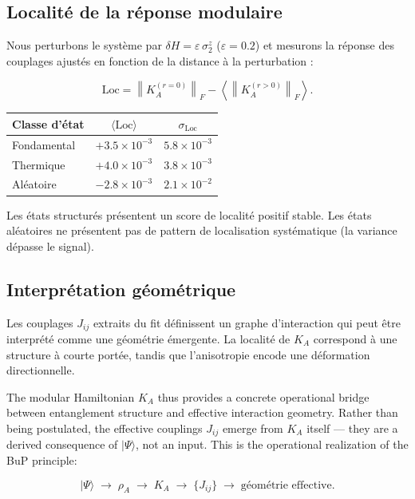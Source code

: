 \documentclass[11pt]{article}
\begin{document}
\subsection{Localité de la réponse modulaire}

Nous perturbons le système par $\delta H = \varepsilon\,\sigma_2^z$ ($\varepsilon = 0.2$) et mesurons la réponse des couplages ajustés en fonction de la distance à la perturbation :

\[
\mathrm{Loc} = \left\|K_A^{(r=0)}\right\|_F - \left\langle \left\|K_A^{(r>0)}\right\|_F \right\rangle.
\]

\begin{center}
\begin{tabular}{lcc}
\toprule
Classe d'état & $\langle\mathrm{Loc}\rangle$ & $\sigma_{\mathrm{Loc}}$ \\
\midrule
Fondamental & $+3.5 \times 10^{-3}$ & $5.8 \times 10^{-3}$ \\
Thermique   & $+4.0 \times 10^{-3}$ & $3.8 \times 10^{-3}$ \\
Aléatoire   & $-2.8 \times 10^{-3}$ & $2.1 \times 10^{-2}$ \\
\bottomrule
\end{tabular}
\end{center}

Les états structurés présentent un score de localité positif stable. Les états aléatoires ne présentent pas de pattern de localisation systématique (la variance dépasse le signal).

\subsection{Interprétation géométrique}

Les couplages $J_{ij}$ extraits du fit définissent un graphe d'interaction qui peut être interprété comme une géométrie émergente. La localité de $K_A$ correspond à une structure à courte portée, tandis que l'anisotropie encode une déformation directionnelle.

\medskip
The modular Hamiltonian $K_A$ thus provides a concrete operational bridge between entanglement structure and effective interaction geometry. Rather than being postulated, the effective couplings $J_{ij}$ emerge from $K_A$ itself --- they are a derived consequence of $|\Psi\rangle$, not an input. This is the operational realization of the BuP principle:

\[
|\Psi\rangle \;\rightarrow\; \rho_A \;\rightarrow\; K_A \;\rightarrow\; \{J_{ij}\} \;\rightarrow\; \text{géométrie effective.}
\]
\end{document}
